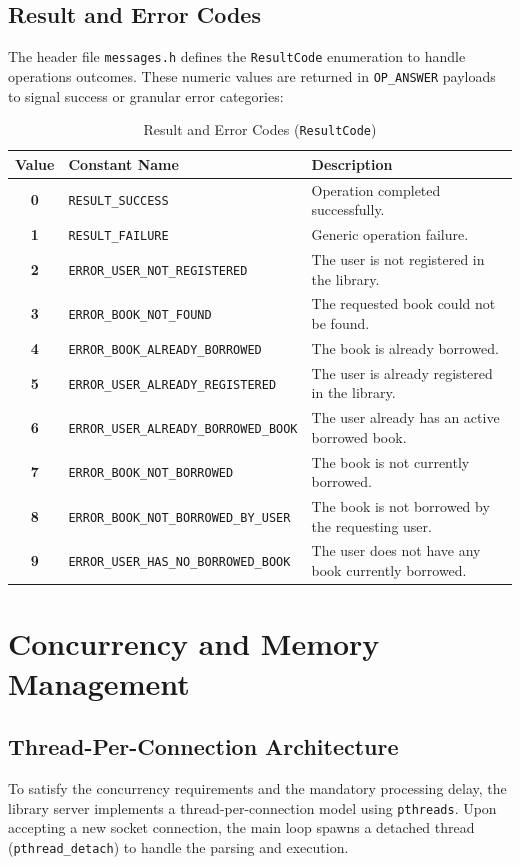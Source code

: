 \documentclass[11pt, a4paper]{article}
\begin{document}
\subsection{Result and Error Codes}
The header file \texttt{messages.h} defines the \texttt{ResultCode} enumeration to handle operations outcomes. These numeric values are returned in \texttt{OP\_ANSWER} payloads to signal success or granular error categories:

\begin{table}[h!]
\centering
\small
\begin{tabular}{|c|l|l|}
\hline
\textbf{Value} & \textbf{Constant Name} & \textbf{Description} \\ \hline
\textbf{0} & \texttt{RESULT\_SUCCESS} & Operation completed successfully. \\ \hline
\textbf{1} & \texttt{RESULT\_FAILURE} & Generic operation failure. \\ \hline
\textbf{2} & \texttt{ERROR\_USER\_NOT\_REGISTERED} & The user is not registered in the library. \\ \hline
\textbf{3} & \texttt{ERROR\_BOOK\_NOT\_FOUND} & The requested book could not be found. \\ \hline
\textbf{4} & \texttt{ERROR\_BOOK\_ALREADY\_BORROWED} & The book is already borrowed. \\ \hline
\textbf{5} & \texttt{ERROR\_USER\_ALREADY\_REGISTERED} & The user is already registered in the library. \\ \hline
\textbf{6} & \texttt{ERROR\_USER\_ALREADY\_BORROWED\_BOOK} & The user already has an active borrowed book. \\ \hline
\textbf{7} & \texttt{ERROR\_BOOK\_NOT\_BORROWED} & The book is not currently borrowed. \\ \hline
\textbf{8} & \texttt{ERROR\_BOOK\_NOT\_BORROWED\_BY\_USER} & The book is not borrowed by the requesting user. \\ \hline
\textbf{9} & \texttt{ERROR\_USER\_HAS\_NO\_BORROWED\_BOOK} & The user does not have any book currently borrowed. \\ \hline
\end{tabular}
\caption{Result and Error Codes (\texttt{ResultCode})}
\label{tab:error_codes}
\end{table}

\section{Concurrency and Memory Management}
\subsection{Thread-Per-Connection Architecture}
To satisfy the concurrency requirements and the mandatory processing delay, the library server implements a thread-per-connection model using \texttt{pthreads}. Upon accepting a new socket connection, the main loop spawns a detached thread (\texttt{pthread\_detach}) to handle the parsing and execution. 
\end{document}
